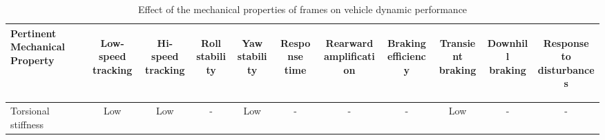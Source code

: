 \begin{table}[H]
	\centering\footnotesize
	\begin{threeparttable}
	
        \begin{tabulary}{\textwidth}{lcccccccccc}
            \toprule
            \textbf{Pertinent Mechanical Property} & \begin{sideways}\textbf{Low-speed tracking}\end{sideways} & \begin{sideways}\textbf{Hi-speed tracking}\end{sideways} & \begin{sideways}\textbf{Roll stability}\end{sideways} & \begin{sideways}\textbf{Yaw stability}\end{sideways} & \begin{sideways}\textbf{Response time}\end{sideways} & \begin{sideways}\textbf{Rearward amplification}\end{sideways} & \begin{sideways}\textbf{Braking efficiency}\end{sideways} & \begin{sideways}\textbf{Transient braking}\end{sideways} & \begin{sideways}\textbf{Downhill braking}\end{sideways} & \begin{sideways}\textbf{Response to disturbances}\end{sideways} \\\midrule
            Torsional stiffness & Low   & Low   & -     & Low   & -     & -     & -     & Low   & -     & -\\
            \bottomrule
		\end{tabulary}

		\caption{Effect of the mechanical properties of frames on vehicle dynamic performance \cite{Fancher1986}}
		\label{table:effect-of-the-mechanical-properties-of-frames-on-vehicle-dynamic-performance}

	\end{threeparttable}
\end{table}

